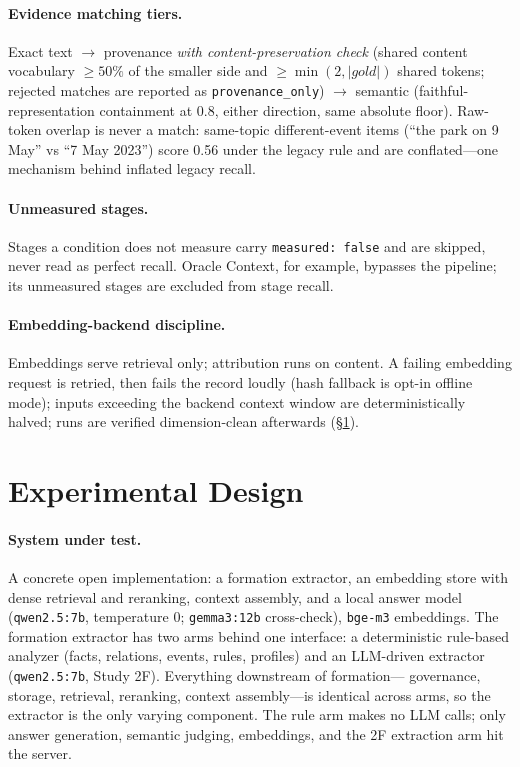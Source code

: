 \documentclass[11pt]{article}
\begin{document}
\paragraph{Evidence matching tiers.}
Exact text $\rightarrow$ provenance \emph{with content-preservation check}
(shared content vocabulary $\geq 50\%$ of the smaller side and
$\geq \min(2, |gold|)$ shared tokens; rejected matches are reported as
\verb|provenance_only|) $\rightarrow$ semantic (faithful-representation
containment at 0.8, either direction, same absolute floor). Raw-token
overlap is never a match: same-topic different-event items (``the park on
9 May'' vs ``7 May 2023'') score 0.56 under the legacy rule and are
conflated---one mechanism behind inflated legacy recall.

\paragraph{Unmeasured stages.}
Stages a condition does not measure carry \verb|measured: false| and are
skipped, never read as perfect recall. Oracle Context, for example,
bypasses the pipeline; its unmeasured stages are excluded from stage
recall.

\paragraph{Embedding-backend discipline.}
Embeddings serve retrieval only; attribution runs on content. A failing
embedding request is retried, then fails the record loudly (hash
fallback is opt-in offline mode); inputs exceeding the backend context
window are deterministically halved; runs are verified dimension-clean
afterwards (\S\ref{sec:design}).

\section{Experimental Design}
\label{sec:design}

\paragraph{System under test.}
A concrete open implementation: a formation extractor, an embedding store
with dense retrieval and reranking, context assembly, and a local answer
model (\texttt{qwen2.5:7b}, temperature 0; \texttt{gemma3:12b} cross-check),
\texttt{bge-m3} embeddings. The formation extractor has two arms behind
one interface: a deterministic rule-based analyzer (facts, relations,
events, rules, profiles) and an LLM-driven extractor
(\texttt{qwen2.5:7b}, Study 2F). Everything downstream of formation---
governance, storage, retrieval, reranking, context assembly---is
identical across arms, so the extractor is the only varying component.
The rule arm makes no LLM calls; only answer generation, semantic
judging, embeddings, and the 2F extraction arm hit the server.
\end{document}
